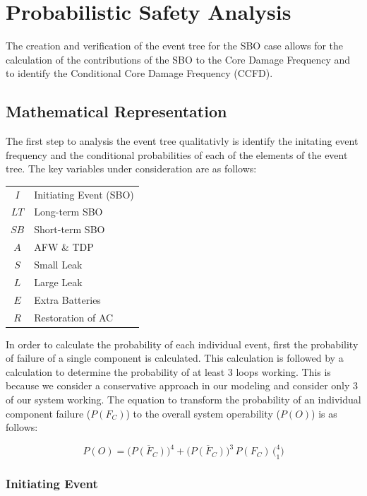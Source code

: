 \documentclass[a4paper,11pt]{article}
\numberwithin{subsubsection}{subsection}
\numberwithin{subsection}{section}
\begin{document}
\section{Probabilistic Safety Analysis}

The creation and verification of the event tree for the SBO case allows for the calculation of the contributions of the SBO to the Core Damage Frequency and to identify the Conditional Core Damage Frequency (CCFD).

\subsection{Mathematical Representation}

The first step to analysis the event tree qualitativly is identify the initating event frequency and the conditional probabilities of each of the elements of the event tree. The key variables under consideration are as follows: 

\begin{tabular}{c l}
    $I$ & Initiating Event (SBO)\\
    $LT$ & Long-term SBO\\
    $SB$ & Short-term SBO\\
    $A$ & AFW \& TDP\\
    $S$ & Small Leak\\
    $L$ & Large Leak\\
    $E$ & Extra Batteries \\
    $R$ & Restoration of AC \\
\end{tabular}

In order to calculate the probability of each individual event, first the probability of failure of a single component is calculated. This calculation is followed by a calculation to determine the probability of at least 3 loops working. This is because we consider a conservative approach in our modeling and consider only 3 of our system working. The equation to transform the probability of an individual component failure ($P(F_C)$) to the overall system operability ($P(O)$) is as follows:

\begin{equation}\label{eq:1}
    P(O) = \bigl( \overline{P(F_C)}\bigr)^4 + \bigl(\overline{P(F_C)}\bigr)^3\,P(F_C)\,\bigl(^4_1\bigr)
\end{equation}

\subsubsection*{Initiating Event}
\end{document}
